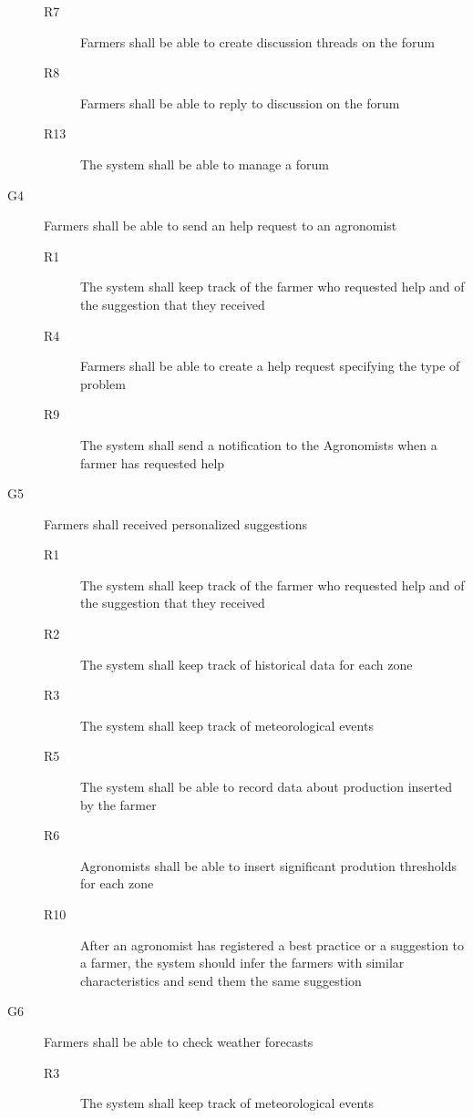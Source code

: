 \begin{description}
        \begin{description}
            \item[R7] Farmers shall be able to create discussion threads on the forum
            \item[R8] Farmers shall be able to reply to discussion on the forum
            \item[R13] The system shall be able to manage a forum
        \end{description}
    \item [G4] Farmers shall be able to send an help request to an agronomist
        \begin{description}
            \item[R1] The system shall keep track of the farmer who requested help and of the suggestion that they received
            \item[R4] Farmers shall be able to create a help request specifying  the type of problem
            \item[R9] The system shall send a notification to the Agronomists when a farmer has requested help
        \end{description}
    \item [G5] Farmers shall received personalized suggestions
        \begin{description}
            \item[R1] The system shall keep track of the farmer who requested help and of the suggestion that they received
            \item[R2] The system shall keep track of historical data for each zone
            \item[R3] The system shall keep track of meteorological events
            \item[R5] The system shall be able to record data about production inserted by the farmer
            \item[R6] Agronomists shall be able to insert significant prodution thresholds for each zone
            \item[R10] After an agronomist has registered a best practice or a suggestion to a farmer, the system should infer the farmers with similar characteristics and send them the same suggestion 
        \end{description}
    \item [G6] Farmers shall be able to check weather forecasts
        \begin{description}
            \item[R3] The system shall keep track of meteorological events

\end{description}
\end{description}
